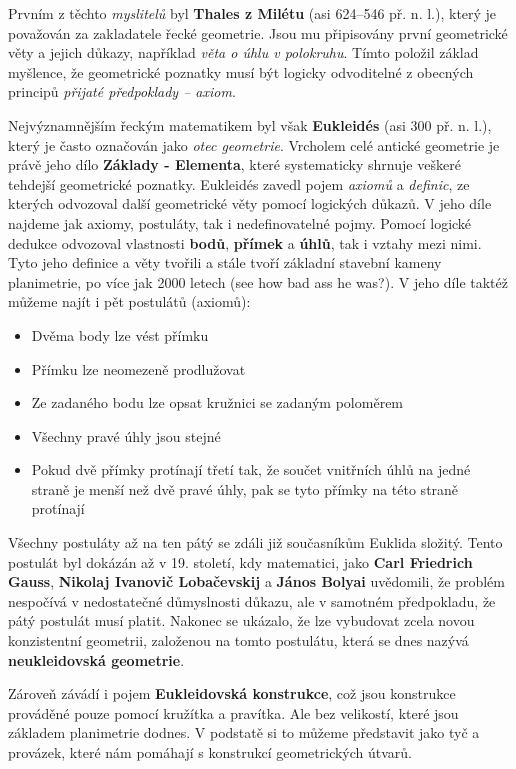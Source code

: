 \documentclass[12pt,a4paper]{article}
\begin{document}
\begin{historicalbox}
Prvním z těchto \emph{myslitelů} byl \textbf{Thales z Milétu} (asi 624–546 př. n. l.),
který je považován za zakladatele řecké geometrie. Jsou mu připisovány první geometrické věty a jejich důkazy,
například \emph{věta o úhlu v polokruhu}. Tímto položil základ myšlence,
že geometrické poznatky musí být logicky odvoditelné z obecných principů \emph{přijaté předpoklady – axiom}.

Nejvýznamnějším řeckým matematikem byl však \textbf{Eukleidés} (asi 300 př. n. l.),
který je často označován jako \emph{otec geometrie}. Vrcholem celé antické geometrie
je právě jeho dílo \textbf{Základy - Elementa}, které systematicky shrnuje veškeré tehdejší geometrické poznatky.
Eukleidés zavedl pojem \emph{axiomů} a \emph{definic}, ze kterých odvozoval další geometrické věty pomocí logických důkazů.
V jeho díle najdeme jak axiomy, postuláty, tak i nedefinovatelné pojmy.
Pomocí logické dedukce odvozoval vlastnosti \textbf{bodů}, \textbf{přímek} a \textbf{úhlů}, tak i vztahy mezi nimi.
Tyto jeho definice a věty tvořili a stále tvoří základní stavební kameny planimetrie, po více jak 2000 letech (see how bad ass he was?).
V jeho díle taktéž můžeme najít i pět postulátů (axiomů):
\begin{itemize}
    \item Dvěma body lze vést přímku
    \item Přímku lze neomezeně prodlužovat
    \item Ze zadaného bodu lze opsat kružnici se zadaným poloměrem
    \item Všechny pravé úhly jsou stejné
    \item Pokud dvě přímky protínají třetí tak, že součet vnitřních úhlů na jedné straně je menší než dvě pravé úhly, pak se tyto přímky na této straně protínají
\end{itemize}

Všechny postuláty až na ten pátý se zdáli již současníkům Euklida složitý. Tento postulát byl dokázán
až v 19. století, kdy matematici, jako \textbf{Carl Friedrich Gauss}, \textbf{Nikolaj Ivanovič Lobačevskij} a
\textbf{János Bolyai} uvědomili, že problém nespočívá v nedostatečné důmyslnosti důkazu, 
ale v samotném předpokladu, že pátý postulát musí platit. Nakonec se ukázalo, že lze vybudovat
zcela novou konzistentní geometrii, založenou na tomto postulátu, která se dnes nazývá \textbf{neukleidovská geometrie}.

Zároveň závádí i pojem \textbf{Eukleidovská konstrukce}, což jsou konstrukce prováděné pouze pomocí kružítka a pravítka.
Ale bez velikostí, které jsou základem planimetrie dodnes. V podstatě si to můžeme představit jako tyč a provázek,
které nám pomáhají s konstrukcí geometrických útvarů.


\end{historicalbox}
\end{document}
